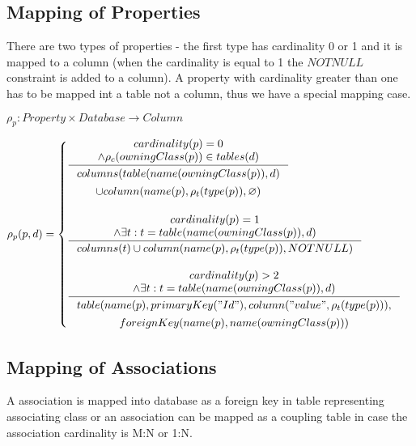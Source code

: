 \documentclass[11pt]{article}
\begin{document}
\subsection{Mapping of Properties}
There are two types of properties - the first type has cardinality 0 or 1 and it is mapped to a column (when the cardinality is equal to 1 the $NOTNULL$ constraint is added to a column). A property with cardinality greater than one has to be mapped int a table not a column, thus we have a special mapping case.



$
\rho_p : Property \times Database \rightarrow Column 
$

$\rho_p(p, d) = \begin{cases}
 \inference{cardinality(p) = 0 \\ \wedge \rho_c(owningClass(p)) \in tables(d)}{\begin{gathered}
 columns(table(name(owningClass(p)),d) \\ \cup column(name(p), \rho_t(type(p)), \varnothing)
\end{gathered}
} \\ \\
 
 \inference{cardinality(p) = 1 \\ \wedge \exists t : t = table(name(owningClass(p)), d)}{columns(t) \cup column(name(p), \rho_t(type(p)), NOTNULL)} \\ \\
 
 \inference{cardinality(p) > 2 \\ \wedge \exists t : t = table(name(owningClass(p)), d)}{\begin{gathered} table(name(p), primaryKey("Id"), column("value", \rho_t(type(p))), \\ foreignKey(name(p), name(owningClass(p))) \end{gathered}}
 \end{cases}$


\subsection{Mapping of Associations}
A association is mapped into database as a foreign key in table representing associating class or an association can be mapped as a coupling table in case the association cardinality is M:N or 1:N.
\end{document}
